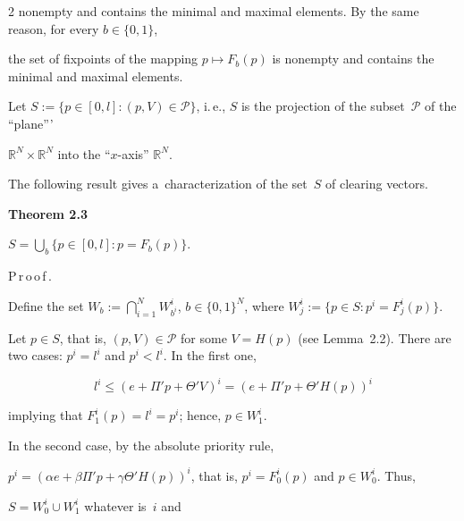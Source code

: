 \begin{multicols}{2}
 nonempty and contains the minimal and maximal elements. By the same reason, for every $b\in \{0,1\}$, 

 the set of  fixpoints of the mapping $p\mapsto F_b(p)$ is nonempty and contains the minimal and maximal elements.

\smallskip



Let  $S:=\{p \in [0, l]\colon (p,V)\in \mathcal{P}\}$, i.\,e., $S$ is the projection of the subset~$\mathcal{P}$ of the ``plane''' 

$\mathbb{R}^N\times \mathbb{R}^N$ into the ``$x$-axis'' $\mathbb{R}^N$. 



The following  result gives a~characterization of the set~$S$ of  clearing vectors. 



\smallskip



\noindent

\textbf{Theorem 2.3}\ %

 $S=\bigcup_b\{p \in [0, l]\colon p=F_b(p)\}$.



\noindent

P\,r\,o\,o\,f\,.\ \

\smallskip

Define the set $

 W_b := \bigcap_{i=1}^{N} W^i_{b^i}$, $b \in \{0, 1\}^N$, where  $W^i_j := \{ p \in S \colon p^i = F^i_j (p)\}$. 

 

 Let $p\in S$, that is, $(p,V) \in \mathcal{P}$ for some $V=H(p)$  (see Lemma~2.2). There are two cases:  $p^i = l^i$ and $p^i < l^i$. In the first one, 

 $$

 l^i \le \left(e + \Pi' p + \Theta' V\right)^i=\left(e + \Pi' p + \Theta' H(p)\right)^i

 $$

implying that $F^i_1 (p)=l^i=p^i$; hence, $p \in W^i_1$.

In the second case,   by the absolute  priority rule, 

$p^i = (\alpha e + \beta \Pi' p + \gamma \Theta' H(p))^i$, that is, $p^i = F^i_0(p)$ and $p \in W^i_0$. Thus, 

 $S = W^i_0 \cup W^i_1$ whatever is~$i$ and  

 

 \vspace*{-4pt}


\end{multicols}
